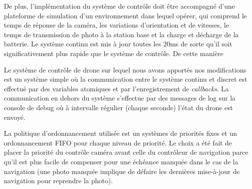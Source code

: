 \documentclass[journal]{IEEEtran}
\begin{document}
De plus, l'implémentation du système de contrôle doit être accompagné d'une plateforme de simulation d'un environnement dans lequel opérer, qui comprend le temps de réponse de la caméra, les variations d'orientation et de vitesses, le temps de transmission de photo à la station base et la charge et décharge de la batterie. Le système continu est mis à jour toutes les 20ms de sorte qu'il soit significativement plus rapide que le système de contrôle. De cette manière 

Le système de contrôle de drone sur lequel nous avons apportés nos modifications est un système simple où la communication entre le système continu et discret est effectué par des variables atomiques et par l'enregistrement de \textit{callbacks}. La communication en dehors du système s'effectue par des messages de log sur la console de debug où à intervalle régulier (chaque seconde) l'état du drone est envoyé.

La politique d'ordonnancement utilisée est un systèmes de priorités fixes et un ordonnancement FIFO pour chaque niveau de priorité. Le choix a été fait de placer la priorité du contrôle caméra avant celle du contrôleur de navigation parce qu'il est plus facile de compenser pour une échéance manquée dans le cas de la navigation (une photo manquée implique de défaire les dernières mise-à-jour de navigation pour reprendre la photo).


%
%

\end{document}
